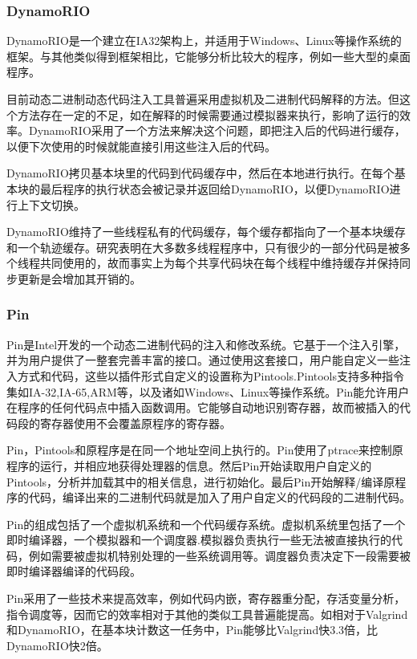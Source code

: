 \subsubsection{DynamoRIO}

DynamoRIO\cite{dynamo}是一个建立在IA32架构上，并适用于Windows、Linux等操作系统的框架。与其他类似得到框架相比，它能够分析比较大的程序，例如一些大型的桌面程序。

目前动态二进制动态代码注入工具普遍采用虚拟机及二进制代码解释的方法。但这个方法存在一定的不足，如在解释的时候需要通过模拟器来执行，影响了运行的效率。DynamoRIO采用了一个方法来解决这个问题，即把注入后的代码进行缓存，以便下次使用的时候就能直接引用这些注入后的代码。

DynamoRIO拷贝基本块里的代码到代码缓存中，然后在本地进行执行。在每个基本块的最后程序的执行状态会被记录并返回给DynamoRIO，以便DynamoRIO进行上下文切换。

DynamoRIO维持了一些线程私有的代码缓存，每个缓存都指向了一个基本块缓存和一个轨迹缓存。研究表明在大多数多线程程序中，只有很少的一部分代码是被多个线程共同使用的，故而事实上为每个共享代码块在每个线程中维持缓存并保持同步更新是会增加其开销的。

\subsubsection{Pin}

Pin\cite{pin}是Intel开发的一个动态二进制代码的注入和修改系统。它基于一个注入引擎，并为用户提供了一整套完善丰富的接口。通过使用这套接口，用户能自定义一些注入方式和代码，这些以插件形式自定义的设置称为Pintools.Pintools支持多种指令集如IA-32,IA-65,ARM等，以及诸如Windows、Linux等操作系统。Pin能允许用户在程序的任何代码点中插入函数调用。它能够自动地识别寄存器，故而被插入的代码段的寄存器使用不会覆盖原程序的寄存器。

Pin，Pintools和原程序是在同一个地址空间上执行的。Pin使用了ptrace来控制原程序的运行，并相应地获得处理器的信息。然后Pin开始读取用户自定义的Pintools，分析并加载其中的相关信息，进行初始化。最后Pin开始解释/编译原程序的代码，编译出来的二进制代码就是加入了用户自定义的代码段的二进制代码。

Pin的组成包括了一个虚拟机系统和一个代码缓存系统。虚拟机系统里包括了一个即时编译器，一个模拟器和一个调度器.模拟器负责执行一些无法被直接执行的代码，例如需要被虚拟机特别处理的一些系统调用等。调度器负责决定下一段需要被即时编译器编译的代码段。

Pin采用了一些技术来提高效率，例如代码内嵌，寄存器重分配，存活变量分析，指令调度等，因而它的效率相对于其他的类似工具普遍能提高。如相对于Valgrind和DynamoRIO，在基本块计数这一任务中，Pin能够比Valgrind快3.3倍，比DynamoRIO快2倍。

